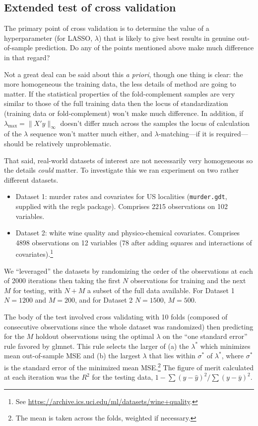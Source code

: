\documentclass{article}
\begin{document}
\subsection*{Extended test of cross validation}

The primary point of cross validation is to determine the value of a
hyperparameter (for LASSO, $\lambda$) that is likely to give best
results in genuine out-of-sample prediction. Do any of the points
mentioned above make much difference in that regard?

Not a great deal can be said about this \textit{a priori}, though one
thing is clear: the more homogeneous the training data, the less
details of method are going to matter. If the statistical properties
of the fold-complement samples are very similar to those of the full
training data then the locus of standardization (training data or
fold-complement) won't make much difference. In addition, if
$\lambda_{\max} = \|X'y\|_{\infty}$ doesn't differ much across the
samples the locus of calculation of the $\lambda$ sequence won't
matter much either, and $\lambda$-matching---if it is
required---should be relatively unproblematic.

That said, real-world datasets of interest are not necessarily very
homogeneous so the details \textit{could} matter. To investigate this
we ran experiment on two rather different datasets.
\begin{itemize}
\item Dataset 1: murder rates and covariates for US localities
  (\texttt{murder.gdt}, supplied with the \textsf{regls} package).
  Comprises 2215 observations on 102 variables.
\item Dataset 2: white wine quality and physico-chemical covariates.
  Comprises 4898 observations on 12 variables (78 after adding squares
  and interactions of covariates).\footnote{See
    \url{https://archive.ics.uci.edu/ml/datasets/wine+quality}.}
\end{itemize}

We ``leveraged'' the datasets by randomizing the order of the
observations at each of 2000 iterations then taking the first $N$
observations for training and the next $M$ for testing, with $N+M$
a subset of the full data available. For Dataset 1 $N=1200$ and
$M=200$, and for Dataset 2 $N=1500$, $M=500$.

The body of the test involved cross validating with 10 folds (composed
of consecutive observations since the whole dataset was randomized)
then predicting for the $M$ holdout observations using the optimal
$\lambda$ on the ``one standard error'' rule favored by
\textsf{glmnet}. This rule selects the larger of (a) the $\lambda^*$
which minimizes mean out-of-sample MSE and (b) the largest $\lambda$
that lies within $\sigma^*$ of $\lambda^*$, where $\sigma^*$ is the
standard error of the minimized mean MSE.\footnote{The mean is taken
  across the folds, weighted if necessary.} The figure of merit
calculated at each iteration was the $R^2$ for the testing data,
$1 - \sum (y-\hat{y})^2 / \sum (y-\bar{y})^2$.
\end{document}
